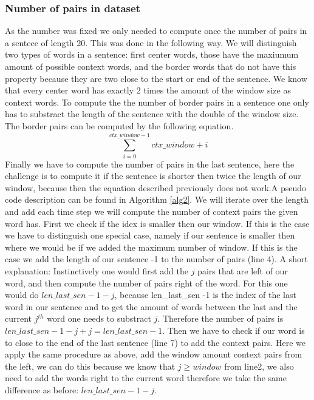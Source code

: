 \subsubsection{Number of pairs in dataset}
 As the number was fixed we only needed to compute once the number of pairs in a sentece of length 20. This was done in the following way. We will distinguish two types of words in a sentence: first center words, those have the maxiumum amount of possible context words, and the border words that do not have this property because they are two close to the start or end of the sentence.
We know that every center word has exactly 2 times the amount of the window size as context words. To compute the the number of border pairs in a sentence one only has to substract the length of the sentence with the double of the window size. The border pairs can be computed by the following equation. 
\begin{equation}
\sum_{i=0}^{ctx\_window -1} ctx\_window + i
\end{equation}
Finally we have to compute the number of pairs in the last sentence, here the challenge is to compute it if the sentence is shorter then twice the length of our window, because then the equation described previously does not work.A pseudo code description can be found in Algorithm \ref{alg2}. We will iterate over the length and add each time step we will compute the number of context pairs the given word has. First we check if the idex is smaller then our window. If this is the case we have to distinguish one special case, namely if our sentence is smaller then where we would be if we added the maximum number of window. If this is the case we add the length of our sentence -1 to the number of pairs (line 4). A short explanation: Instinctively one would first add the $j$ pairs that are left of our word, and then compute the number of pairs right of the word. For this one would do $len\_last\_sen -1 -j$, because len\_last\_sen -1  is the index of the last word in our sentence and to get the amount of words between the  last and the current $j^{th}$ word one needs to substract $j$. Therefore the number of pairs is $len\_last\_sen -1 -j + j = len\_last\_sen -1$.  Then we have to check if our word is to close to the end of the last sentence (line 7) to add the context pairs. Here we apply the same procedure as above, add the window amount context pairs from the left, we can do this because we know that $j \geq window$ from line2, we also need to add the words right to the current word therefore we take the same difference as before: $len\_last\_sen -1 -j$.
